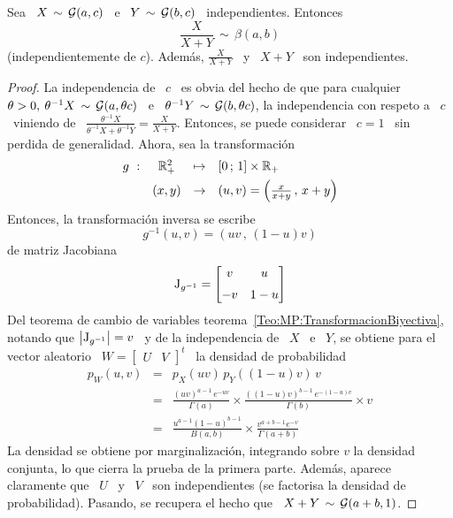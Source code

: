 \begin{lema}
\label{Lem:MP:VinculoBetaGamma}
%
  Sea  \   $X  \,  \sim  \,   \mathcal{G}(a,c)$  \  e  \   $Y  \,  \sim   \,  \mathcal{G}(b,c)$  \
  independientes. Entonces
  \[
  \frac{X}{X+Y} \, \sim \, \beta(a,b)
  \]
  (independientemente  de $c$).   Adem\'as, $\frac{X}{X+Y}$  \ y  \ $X+Y$  \ son
  independientes.
\end{lema}
%
\begin{proof}
  La independencia de \ $c$ \ es obvia del hecho de que para cualquier $\theta >
  0, \: \theta^{-1} X \, \sim \, \mathcal{G}(a,\theta c)$ \ e \ $\theta^{-1} Y \, \sim \,
  \mathcal{G}(b,\theta  c)$,  la independencia  con  respeto  a \  $c$  \  viniendo de  \
  $\frac{\theta^{-1}     X}{\theta^{-1}     X     +     \theta^{-1}     Y}     =
  \frac{X}{X+Y}$.  Entonces, se  puede considerar  \ $c  = 1$  \ sin  perdida de
  generalidad. Ahora, sea la transformaci\'on
  \[
  \begin{array}{lccl}
    g\ : & \mathbb{R}_+^2 & \mapsto & [0 \, ; \, 1] \times \mathbb{R}_+\\[1.5mm]
    & (x,y) & \to & (u,v) = \left( \frac{x}{x+y} \, , \, x+y \right)
  \end{array}
  \]
  Entonces, la transformaci\'on inversa se escribe
  \[
  g^{-1}(u,v) = \left( u v \, , \, (1-u) v \right)
  \]
  de matriz Jacobiana
  \[
  \operatorname{J}_{g^{-1}} = \begin{bmatrix} v & u \\[2mm] -v & 1-u \end{bmatrix}
  \]
  Del          teorema          de          cambio         de          variables
  teorema~\ref{Teo:MP:TransformacionBiyectiva},      notando     que     $\left|
    \operatorname{J}_{g^{-1}} \right| =  v$ \ y de la  independencia de \ $X$ \ e  \ $Y$, se
  obtiene para el vector aleatorio \ $W = \begin{bmatrix} U & V \end{bmatrix}^t$
  \ la densidad de probabilidad
  \begin{eqnarray*}
    p_W(u,v) & = & p_X( u v ) \, p_Y( (1-u) v ) \, v\\[2mm]
    & = & \frac{\left( u v \right)^{a-1} \, e^{- u v}}{\Gamma(a)} \times
    \frac{\left( (1-u) v \right)^{b-1} \, e^{- (1-u) v}}{\Gamma(b)} \times v\\[2mm]
    & = & \frac{u^{a-1} (1-u)^{b-1}}{B(a,b)} \times \frac{v^{a+b-1} e^{-v}}{\Gamma(a+b)}
  \end{eqnarray*}
  La  densidad se  obtiene por  marginalizaci\'on, \ie  integrando sobre  $v$ la
  densidad conjunta,  lo que  cierra la prueba  de la primera  parte.  Adem\'as,
  aparece claramente que \  $U$ \ y \ $V$ \ son  independientes (se factorisa la
  densidad de probabilidad).   Pasando, se recupera el hecho que  \ $X+Y \, \sim
  \, \mathcal{G}(a+b,1)$.
\end{proof}

